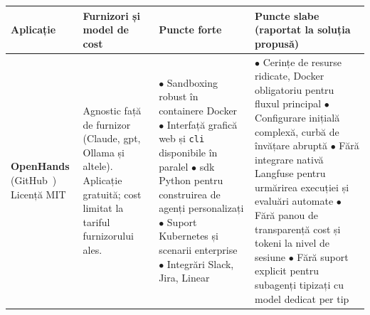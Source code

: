 \documentclass[12pt, a4paper, oneside, romanian]{teza-upb}
\begin{document}
    \begin{table}[H]
    \centering
    \scriptsize
    \setlength{\tabcolsep}{4pt}
    \renewcommand{\arraystretch}{1.5}
    \vspace{2mm}
      \begin{tabularx}{\textwidth}{@{} >{\hsize=0.55\hsize\RaggedRight}X >{\hsize=0.95\hsize\RaggedRight}X >{\hsize=1.25\hsize\RaggedRight}X >{\hsize=1.25\hsize\RaggedRight}X @{}}
        \toprule
        \textbf{Aplicație} & \textbf{Furnizori și model de cost} & \textbf{Puncte forte} & \textbf{Puncte slabe (raportat la soluția propusă)} \\
        \midrule

        \textbf{OpenHands} \newline (GitHub~\cite{gh_openhands}) \newline Licență MIT &
        Agnostic față de furnizor (Claude, \ac{gpt}, Ollama și altele). \newline
        Aplicație gratuită; cost limitat la tariful furnizorului ales. &
        $\bullet$ Sandboxing robust în containere Docker\newline
        $\bullet$ Interfață grafică web și \texttt{cli} disponibile în paralel\newline
        $\bullet$ \ac{sdk} Python pentru construirea de agenți personalizați\newline
        $\bullet$ Suport Kubernetes și scenarii enterprise\newline
        $\bullet$ Integrări Slack, Jira, Linear &
        $\bullet$ Cerințe de resurse ridicate, Docker obligatoriu pentru fluxul principal\newline
        $\bullet$ Configurare inițială complexă, curbă de învățare abruptă\newline
        $\bullet$ Fără integrare nativă Langfuse pentru urmărirea execuției și evaluări automate\newline
        $\bullet$ Fără panou de transparență cost și tokeni la nivel de sesiune\newline
        $\bullet$ Fără suport explicit pentru subagenți tipizați cu model dedicat per tip \\
        \midrule


\end{tabularx}
\end{table}
\end{document}
